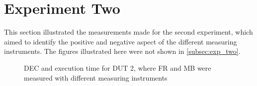 \section{Experiment Two}\label{app:exp_two}

This section illustrated the measurements made for the second experiment, which aimed to identify the positive and negative aspect of the different measuring instruments. The figures illustrated here were not shown in \cref{subsec:exp_two}.

\begin{figure}[H]
    \centering
    \begin{subfigure}[b]{0.4\textwidth}
        \centering
        
    \end{subfigure}
    \hfill
    \begin{subfigure}[b]{0.4\textwidth}
        \centering
        
    \end{subfigure}
    \caption{DEC and execution time for DUT 2, where FR and MB were measured with different measuring instruments}
\end{figure}





% 
% 

% 
% 
% 

